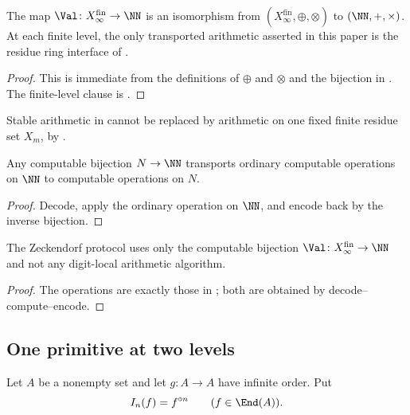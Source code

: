 \begin{theorem}
\label{thm:semiring}
The map \(\Val\colon X_\infty^{\mathrm{fin}}\to\NN\) is an isomorphism from
\((X_\infty^{\mathrm{fin}},\oplus,\otimes)\) to \((\NN,+,\times)\).  At each
finite level, the only transported arithmetic asserted in this paper is the
residue ring interface of .
\end{theorem}

\begin{proof}
This is immediate from the definitions of \(\oplus\) and \(\otimes\) and the
bijection in .  The finite-level clause
is .
\end{proof}

Stable arithmetic in  cannot be replaced by arithmetic on one
fixed finite residue set \(X_m\), by .

\begin{lemma}
\label{lem:value-transported-suffices}
Any computable bijection \(N\to\NN\) transports ordinary computable operations on
\(\NN\) to computable operations on \(N\).
\end{lemma}

\begin{proof}
Decode, apply the ordinary operation on \(\NN\), and encode back by the inverse
bijection.
\end{proof}

\begin{proposition}
\label{prop:value-transport-exact-interface}
The Zeckendorf protocol uses only the computable bijection
\(\Val\colon X_\infty^{\mathrm{fin}}\to\NN\) and not any digit-local arithmetic
algorithm.
\end{proposition}

\begin{proof}
The operations are exactly those in ; both are obtained by
decode--compute--encode.
\end{proof}

\subsection{One primitive at two levels}\label{ssec:sole}

Let \(A\) be a nonempty set and let \(g\colon A\to A\) have infinite order.  Put
\[
  I_n(f)=f^{\circ n}\qquad(f\in\End(A)).
\]


